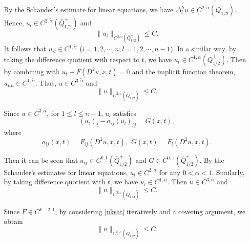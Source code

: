 \documentclass[preprint,12pt]{elsarticle}
\theoremstyle{definition}
\theoremstyle{remark}
\numberwithin{equation}{section}
\begin{document}
By the Schauder's estimate for linear equations, we have $\Delta_l^h u \in C^{2,\tilde \alpha}(\bar{Q}^+_{1/2})$. Hence, $u_l \in C^{2,\tilde \alpha}(\bar{Q}^+_{1/2})$ and
\begin{equation*}
\|u_l\|_{C^{2,\tilde \alpha}(\bar{Q}_{1/2}^+)}\leq C.
\end{equation*}
It follows that $u_{i l}\in C^{1,\tilde \alpha}$ ($i=1,2,\cdots,n; l=1,2,\cdots,n-1$). In a similar way, by taking the difference quotient with respect to $t$, we have $u_t \in C^{1,\tilde \alpha}(\bar Q^+_{1/2})$. Then by combining with $u_t-F(D^2u,x,t)=0$ and the implicit function theorem, $u_{nn}\in C^{1,\tilde \alpha}$. Thus, $u\in C^{3,\tilde \alpha}$ and
\begin{equation*}
\|u\|_{C^{3,\tilde \alpha}(\bar Q_{1/2}^+)}\leq C.
\end{equation*}

Since $u\in C^{3,\tilde \alpha}$, for $1\leq l \leq n-1$, $u_l$ satisfies
\begin{equation}\label{uksat}
  (u_l)_t-a_{ij}(u_l)_{ij}=G(x,t),
\end{equation}
where
\begin{equation}\label{aijuk}
  a_{ij}(x,t)=F_{ij}(D^2u,x,t), ~~G(x,t)=F_{l}(D^2u,x,t).
\end{equation}

Then it can be seen that $a_{ij}\in C^{0,1}(\bar{Q}^+_{1/2})$ and $G\in C^{0,1}(\bar{Q}^+_{1/2})$. By the Schauder's estimates for linear equations, $u_l\in C^{2,\alpha}$ for any $0<\alpha<1$. Similarly, by taking difference quotient with $t$, we have $u_t\in C^{1,\alpha}$. Then $u\in C^{3,\alpha}$ and
\begin{equation*}
\|u\|_{C^{3,\alpha}(\bar{Q}_{1/4}^+)}\leq C.
\end{equation*}

Since $F\in C^{k-2,1}$, by considering \cref{uksat} iteratively and a covering argument, we obtain
\begin{equation*}
\|u\|_{C^{k,\alpha}(\bar{Q}^+_{1/2})}\leq C.
\end{equation*}
\end{document}
